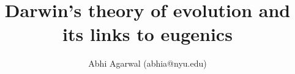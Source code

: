 \documentclass[11pt, oneside]{article}
\title{Darwin's theory of evolution and its links to eugenics}
\author{Abhi Agarwal (abhia@nyu.edu)}
\date{}
\begin{document}
\maketitle

\par 

\end{document}
